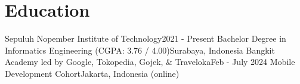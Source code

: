 \section{Education}
    \resumeSubHeadingListStart

    \resumeSubheading
    {Sepuluh Nopember Institute of Technology}{2021 - Present}
    {Bachelor Degree in Informatics Engineering (CGPA: 3.76 / 4.00)}{Surabaya, Indonesia}
    \resumeSubheading
    {Bangkit Academy led by Google, Tokopedia, Gojek, \& Traveloka}{Feb - July 2024}
    {Mobile Development Cohort}{Jakarta, Indonesia (online)}

    \resumeSubHeadingListEnd
